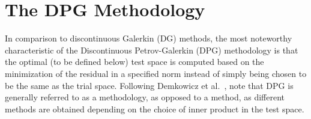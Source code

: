 \chapter{The DPG Methodology}

In comparison to discontinuous Galerkin (DG) methods, the most noteworthy characteristic of the Discontinuous
Petrov-Galerkin (DPG) methodology is that the optimal (to be defined below) test space is computed based on the
minimization of the residual in a specified norm instead of simply being chosen to be the same as the trial space.
Following Demkowicz et al.~\cite{Demkowicz2017}, note that DPG is generally referred to as a methodology, as opposed to
a method, as different methods are obtained depending on the choice of inner product in the test space.


